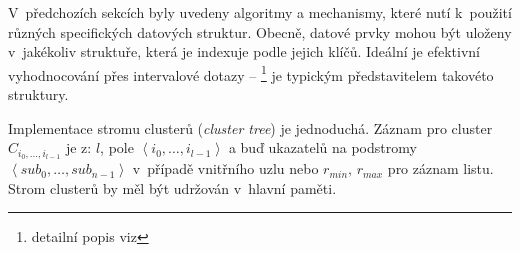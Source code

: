 V~předchozích sekcích byly uvedeny algoritmy a mechanismy, které
nutí k~použití různých specifických datových struktur\@. Obecně,
datové prvky mohou být uloženy v~jakékoliv struktuře, která je indexuje
podle jejich \MIndex klíčů. Ideální je efektivní vyhodnocování přes
intervalové dotazy -- \BPTree{}\cite{Cormen:2001:IA:580470}%
\footnote{detailní popis \BPTree{} viz %
} je typickým představitelem takovéto struktury\@.

Implementace stromu clusterů (\emph{cluster tree}) je jednoduchá\@.
Záznam pro cluster $C_{i_{0},\ldots,i_{l-1}}$ je z: $l$, pole $\left\langle i_{0},\ldots,i_{l-1}\right\rangle $
a buď ukazatelů na podstromy $\left\langle sub_{0},\ldots,sub_{n-1}\right\rangle $
v~případě vnitřního uzlu nebo $r_{min},\, r_{max}$ pro záznam listu\@.
Strom clusterů by měl být udržován v~hlavní paměti.
